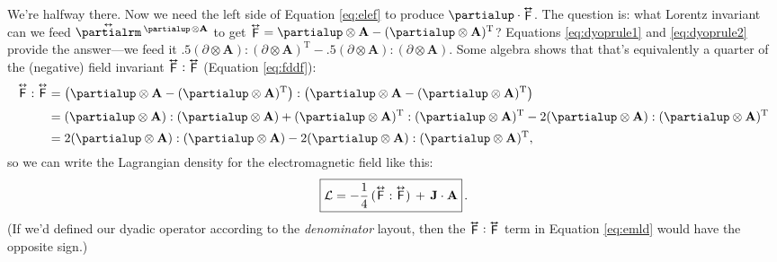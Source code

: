 \documentclass[12pt]{article}
\renewcommand{\vv}[1]{\mathbf{#1}}
\newcommand{\tightoverset}[2]{%
  \mathop{#2}\limits^{\vbox to -.5ex{\kern-0.75ex\hbox{$#1$}\vss}}}
\newcommand{\inlinedy}[1]{\tightoverset{\text{\tiny$\bm\leftrightarrow$}}{#1}}
\newcommand{\capdy}[1]{ \overset{ \text{\tiny$\bm\leftrightarrow$} }{\vphantom{\text{\small{A}}}\smash{#1}} }
\begin{document}
We're halfway there. Now we need the left side of Equation \ref{eq:elef} to produce $\partialup \cdot \inlinedy{\mathsf{F}}$. The question is: what Lorentz invariant can we feed $\inlinedy{\partialrm} {}^{\partialup \mkern2mu \otimes \vv A}$ to get $\inlinedy{\mathsf{F}} = \partialup \otimes \vv A - (\partialup \otimes \vv A)^\mathrm{T}$? Equations \ref{eq:dyoprule1} and \ref{eq:dyoprule2} provide the answer---we feed it $ .5(\partialup \otimes \vv A):(\partialup \otimes \vv A)^\mathrm{T} - .5(\partialup \otimes \vv A):(\partialup \otimes \vv A) $. Some algebra shows that that's equivalently a quarter of the (negative) field invariant $ \inlinedy{\mathsf{F}} : \inlinedy{\mathsf{F}} $ (Equation \ref{eq:fddf}):
\begin{equation*}
\begin{aligned}
\capdy{\mathsf{F}} : \capdy{\mathsf{F}} &= \left( \partialup \otimes \vv A - (\partialup \otimes \vv A)^\mathrm{T} \right) : \left( \partialup \otimes \vv A - (\partialup \otimes \vv A)^\mathrm{T} \right) \\[2pt]
&= (\partialup \otimes \vv A):(\partialup \otimes \vv A) + (\partialup \otimes \vv A)^\mathrm{T} : (\partialup \otimes \vv A)^\mathrm{T}  - 2 (\partialup \otimes \vv A):(\partialup \otimes \vv A)^\mathrm{T} \\[2pt]
&= 2 (\partialup \otimes \vv A):(\partialup \otimes \vv A) - 2 (\partialup \otimes \vv A):(\partialup \otimes \vv A)^\mathrm{T},
\end{aligned}
\end{equation*}
so we can write the Lagrangian density for the electromagnetic field like this:
\begin{equation}\label{eq:emld}
\boxed{\mathcal{L} = - \dfrac{1}{4} \, ( \capdy{\mathsf{F}} : \capdy{\mathsf{F}} ) \, + \, \vv J \cdot \vv A} \, .
\end{equation}
(If we'd defined our dyadic operator according to the \emph{denominator} layout, then the $\inlinedy{\mathsf{F}} : \inlinedy{\mathsf{F}}$ term in Equation \ref{eq:emld} would have the opposite sign.)
\end{document}
